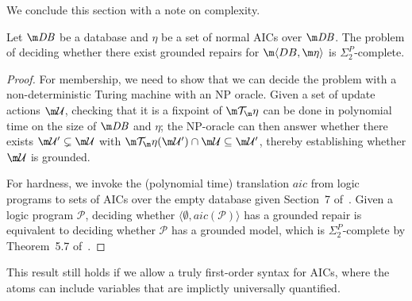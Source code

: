 We conclude this section with a note on complexity.

\begin{theorem}
  \label{thm:grounded-complexity}
  Let $\db$ be a database and $\eta$ be a set of normal AICs over $\db$.
  The problem of deciding whether there exist grounded repairs for $\fulldb$ is $\Sigma^P_2$-complete.
\end{theorem}
\begin{proof}
  For membership, we need to show that we can decide the problem with a non-deterministic Turing machine with an NP oracle.
  Given a set of update actions $\UU$, checking that it is a fixpoint of $\Op$ can be done in polynomial time on the size of $\db$ and $\eta$; the NP-oracle can then answer whether there exists $\UU'\subsetneq\UU$ with $\Op(\UU')\cap\UU\subseteq\UU'$, thereby establishing whether $\UU$ is grounded.

  For hardness, we invoke the (polynomial time) translation $\mathit{aic}$ from logic programs to sets of AICs over the empty database given Section~7 of~\cite{Caroprese2011}.
  Given a logic program $\mathcal P$, deciding whether $\langle\emptyset,\mathit{aic}(\mathcal P)\rangle$ has a grounded repair is equivalent to deciding whether $\mathcal P$ has a grounded model, which is $\Sigma^P_2$-complete by Theorem~5.7 of~.
\end{proof}

This result still holds if we allow a truly first-order syntax for AICs, where the atoms can include variables that are implictly universally quantified.

